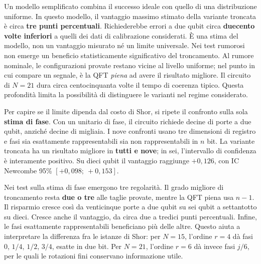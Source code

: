 \begin{onehalfspace}
Un modello semplificato combina il successo ideale con quello di una distribuzione uniforme. In questo modello, il vantaggio massimo stimato della variante troncata è circa \textbf{tre punti percentuali}. Richiederebbe errori a due qubit circa \textbf{duecento volte inferiori} a quelli dei dati di calibrazione considerati. È una stima del modello, non un vantaggio misurato né un limite universale. Nei test rumorosi non emerge un beneficio statisticamente significativo del troncamento. Al rumore nominale, le configurazioni provate restano vicine al livello uniforme; nel punto in cui compare un segnale, è la QFT \emph{piena} ad avere il risultato migliore. Il circuito di $N=21$ dura circa centocinquanta volte il tempo di coerenza tipico. Questa profondità limita la possibilità di distinguere le varianti nel regime considerato.

Per capire se il limite dipenda dal costo di Shor, si ripete il confronto sulla sola \textbf{stima di fase}. Con un unitario di fase, il circuito richiede decine di porte a due qubit, anziché decine di migliaia. I nove confronti usano tre dimensioni di registro e fasi sia esattamente rappresentabili sia non rappresentabili in $n$ bit. La variante troncata ha un risultato migliore in \textbf{tutti e nove}; in sei, l'intervallo di confidenza è interamente positivo. Su dieci qubit il vantaggio raggiunge $+0{,}126$, con IC Newcombe 95\% $[+0{,}098;\ +0{,}153]$.

Nei test sulla stima di fase emergono tre regolarità. Il grado migliore di troncamento resta \textbf{due o tre} alle taglie provate, mentre la QFT piena usa $n-1$. Il risparmio cresce così da venticinque porte a due qubit su sei qubit a settantotto su dieci. Cresce anche il vantaggio, da circa due a tredici punti percentuali. Infine, le fasi esattamente rappresentabili beneficiano più delle altre. Questo aiuta a interpretare la differenza fra le istanze di Shor: per $N=15$, l'ordine $r=4$ dà fasi $0$, $1/4$, $1/2$, $3/4$, esatte in due bit. Per $N=21$, l'ordine $r=6$ dà invece fasi $j/6$, per le quali le rotazioni fini conservano informazione utile.


\end{onehalfspace}
